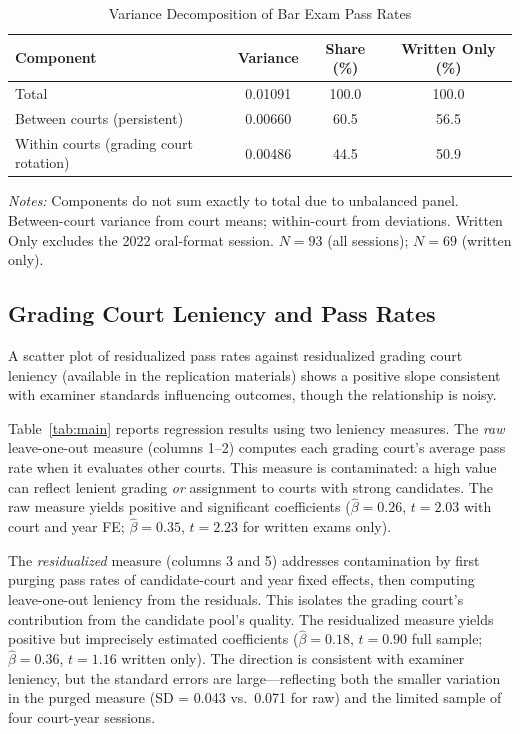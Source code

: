 \documentclass[11pt]{article}
\begin{document}
\begin{table}[htbp]
\centering
\caption{Variance Decomposition of Bar Exam Pass Rates}
\label{tab:variance}
\begin{tabular}{lccc}
\toprule
Component & Variance & Share (\%) & Written Only (\%) \\
\midrule
Total & 0.01091 & 100.0 & 100.0 \\
Between courts (persistent) & 0.00660 & 60.5 & 56.5 \\
Within courts (grading court rotation) & 0.00486 & 44.5 & 50.9 \\
\bottomrule
\end{tabular}
\begin{minipage}{0.9\textwidth}
\footnotesize
\textit{Notes:} Components do not sum exactly to total due to unbalanced panel. Between-court variance from court means; within-court from deviations. Written Only excludes the 2022 oral-format session. $N = 93$ (all sessions); $N = 69$ (written only).
\end{minipage}
\end{table}

\subsection{Grading Court Leniency and Pass Rates}

A scatter plot of residualized pass rates against residualized grading court leniency (available in the replication materials) shows a positive slope consistent with examiner standards influencing outcomes, though the relationship is noisy.


Table~\ref{tab:main} reports regression results using two leniency measures. The \textit{raw} leave-one-out measure (columns 1--2) computes each grading court's average pass rate when it evaluates other courts. This measure is contaminated: a high value can reflect lenient grading \textit{or} assignment to courts with strong candidates. The raw measure yields positive and significant coefficients ($\hat{\beta} = 0.26$, $t = 2.03$ with court and year FE; $\hat{\beta} = 0.35$, $t = 2.23$ for written exams only).

The \textit{residualized} measure (columns 3 and 5) addresses contamination by first purging pass rates of candidate-court and year fixed effects, then computing leave-one-out leniency from the residuals. This isolates the grading court's contribution from the candidate pool's quality. The residualized measure yields positive but imprecisely estimated coefficients ($\hat{\beta} = 0.18$, $t = 0.90$ full sample; $\hat{\beta} = 0.36$, $t = 1.16$ written only). The direction is consistent with examiner leniency, but the standard errors are large---reflecting both the smaller variation in the purged measure (SD = 0.043 vs.\ 0.071 for raw) and the limited sample of four court-year sessions.
\end{document}
